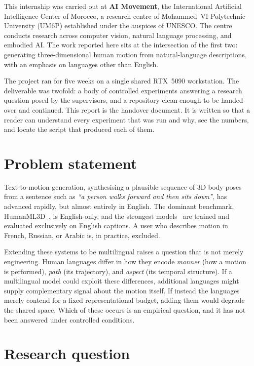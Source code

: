 \documentclass[11pt,a4paper]{report}
\begin{document}
This internship was carried out at \textbf{AI Movement}, the International
Artificial Intelligence Center of Morocco, a research centre of
Mohammed~VI Polytechnic University (UM6P) established under the auspices of
UNESCO. The centre conducts research across computer vision, natural
language processing, and embodied AI. The work reported here sits at the
intersection of the first two: generating three-dimensional human motion
from natural-language descriptions, with an emphasis on languages other
than English.

The project ran for five weeks on a single shared RTX~5090 workstation.
The deliverable was twofold: a body of controlled experiments answering a
research question posed by the supervisors, and a repository clean enough
to be handed over and continued. This report is the handover document. It
is written so that a reader can understand every experiment that was run
and why, see the numbers, and locate the script that produced each of
them.

\section{Problem statement}

Text-to-motion generation, synthesising a plausible sequence of 3D body
poses from a sentence such as \emph{``a person walks forward and then sits
down''}, has advanced rapidly, but almost entirely in English. The
dominant benchmark, HumanML3D~\cite{guo2022humanml3d}, is English-only, and
the strongest models~\cite{tevet2023mdm,guo2024momask} are trained and
evaluated exclusively on English captions. A user who describes motion in
French, Russian, or Arabic is, in practice, excluded.

Extending these systems to be multilingual raises a question that is not
merely engineering. Human languages differ in how they encode
\emph{manner} (how a motion is performed), \emph{path} (its trajectory),
and \emph{aspect} (its temporal structure). If a multilingual model could
exploit these differences, additional languages might supply complementary
signal about the motion itself. If instead the languages merely contend
for a fixed representational budget, adding them would degrade the shared
space. Which of these occurs is an empirical question, and it has not been
answered under controlled conditions.

\section{Research question}
\end{document}
